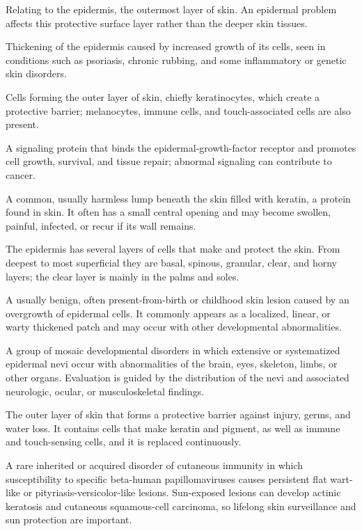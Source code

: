  Relating to the epidermis, the outermost layer of skin. An epidermal problem affects this protective surface layer rather than the deeper skin tissues.

 Thickening of the epidermis caused by increased growth of its cells, seen in conditions such as psoriasis, chronic rubbing, and some inflammatory or genetic skin disorders.

 Cells forming the outer layer of skin, chiefly keratinocytes, which create a protective barrier; melanocytes, immune cells, and touch-associated cells are also present.

 A signaling protein that binds the epidermal-growth-factor receptor and promotes cell growth, survival, and tissue repair; abnormal signaling can contribute to cancer.

 A common, usually harmless lump beneath the skin filled with keratin, a protein found in skin. It often has a small central opening and may become swollen, painful, infected, or recur if its wall remains.

 The epidermis has several layers of cells that make and protect the skin. From deepest to most superficial they are basal, spinous, granular, clear, and horny layers; the clear layer is mainly in the palms and soles.

 A usually benign, often present-from-birth or childhood skin lesion caused by an overgrowth of epidermal cells. It commonly appears as a localized, linear, or warty thickened patch and may occur with other developmental abnormalities.

 A group of mosaic developmental disorders in which extensive or systematized epidermal nevi occur with abnormalities of the brain, eyes, skeleton, limbs, or other organs. Evaluation is guided by the distribution of the nevi and associated neurologic, ocular, or musculoskeletal findings.

 The outer layer of skin that forms a protective barrier against injury, germs, and water loss. It contains cells that make keratin and pigment, as well as immune and touch-sensing cells, and it is replaced continuously.

 A rare inherited or acquired disorder of cutaneous immunity in which susceptibility to specific beta-human papillomaviruses causes persistent flat wart-like or pityriasis-versicolor-like lesions. Sun-exposed lesions can develop actinic keratosis and cutaneous squamous-cell carcinoma, so lifelong skin surveillance and sun protection are important.

